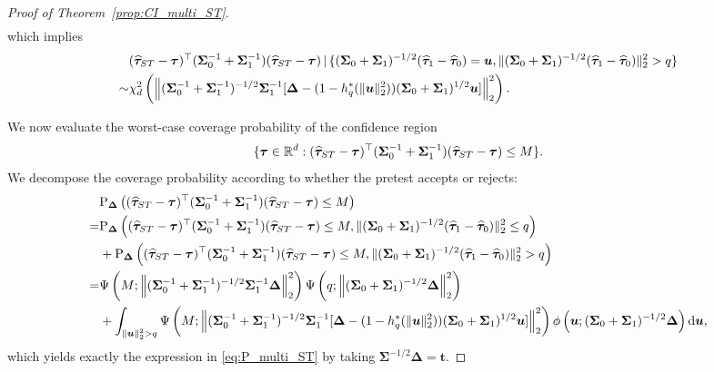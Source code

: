 \documentclass[10pt,a4paper]{amsart}
\def\P{{\mathrm P}}
\def\d{{\mathrm d}}
\def\given{\,|\,}
\newcommand{\htau}{\widehat\tau}
\begin{document}
\begin{proof}[Proof of Theorem~\ref{prop:CI_multi_ST}]
\begin{align*}
\end{align*}
which implies
\begin{align*}
  &(\bm{\htau}_{\rm ST} - \bm{\tau})^\top (\bm{\Sigma}_0^{-1} + \bm{\Sigma}_1^{-1}) (\bm{\htau}_{\rm ST} - \bm{\tau}) \given \{(\bm{\Sigma}_0+ \bm{\Sigma}_1)^{-1/2}(\bm{\htau}_1 - \bm{\htau}_0) = \bm{u}, \lVert (\bm{\Sigma}_0+ \bm{\Sigma}_1)^{-1/2}(\bm{\htau}_1 - \bm{\htau}_0) \rVert_2^2 > q\} \\
  \sim& \chi^2_d\left(\left\lVert (\bm{\Sigma}_0^{-1} + \bm{\Sigma}_1^{-1})^{-1/2} \bm{\Sigma}_1^{-1} [\bm{\Delta} - (1-h_q^*(\lVert \bm{u} \rVert_2^2))(\bm{\Sigma}_0+ \bm{\Sigma}_1)^{1/2} \bm{u}]\right\rVert_2^2\right).
\end{align*}

We now evaluate the worst-case coverage probability of the confidence region
\[
  \{\bm{\tau}\in\mathbb{R}^d:(\bm{\htau}_{\rm ST}-\bm{\tau})^\top (\bm{\Sigma}_0^{-1} + \bm{\Sigma}_1^{-1})(\bm{\htau}_{\rm ST}-\bm{\tau})\le M\}.
\]
We decompose the coverage probability according to whether the
pretest accepts or rejects:
\begin{align*}
  &\P_{\bm{\Delta}}\left((\bm{\htau}_{\rm ST}-\bm{\tau})^\top (\bm{\Sigma}_0^{-1} + \bm{\Sigma}_1^{-1})(\bm{\htau}_{\rm ST}-\bm{\tau})\le M\right)\\
  =& \P_{\bm{\Delta}}\left((\bm{\htau}_{\rm ST}-\bm{\tau})^\top (\bm{\Sigma}_0^{-1} + \bm{\Sigma}_1^{-1})(\bm{\htau}_{\rm ST}-\bm{\tau})\le M, \lVert (\bm{\Sigma}_0+ \bm{\Sigma}_1)^{-1/2}(\bm{\htau}_1 - \bm{\htau}_0) \rVert_2^2 \le q\right) \\
  &+ \P_{\bm{\Delta}}\left((\bm{\htau}_{\rm ST}-\bm{\tau})^\top (\bm{\Sigma}_0^{-1} + \bm{\Sigma}_1^{-1})(\bm{\htau}_{\rm ST}-\bm{\tau})\le M, \lVert (\bm{\Sigma}_0+ \bm{\Sigma}_1)^{-1/2}(\bm{\htau}_1 - \bm{\htau}_0) \rVert_2^2 > q\right)\\
  =& \Psi\left(M;\left\lVert (\bm{\Sigma}_0^{-1} + \bm{\Sigma}_1^{-1})^{-1/2} \bm{\Sigma}_1^{-1} \bm{\Delta}\right\rVert_2^2\right) \Psi\left(q; \left\lVert (\bm{\Sigma}_0 + \bm{\Sigma}_1)^{-1/2} \bm{\Delta}\right\rVert_2^2\right)\\
  &+ \int_{\lVert \bm{u} \rVert_2^2 > q} \Psi\left(M;\left\lVert (\bm{\Sigma}_0^{-1} + \bm{\Sigma}_1^{-1})^{-1/2} \bm{\Sigma}_1^{-1} [\bm{\Delta} - (1-h_q^*(\lVert \bm{u} \rVert_2^2))(\bm{\Sigma}_0+ \bm{\Sigma}_1)^{1/2} \bm{u}]\right\rVert_2^2\right) \phi\left(\bm{u};(\bm{\Sigma}_0 + \bm{\Sigma}_1)^{-1/2} \bm{\Delta}\right) \d \bm{u},
\end{align*}
which yields exactly the expression in \eqref{eq:P_multi_ST} by taking $\bm{\Sigma}^{-1/2}\bm{\Delta} = \bm{t}$.


\end{proof}
\end{document}
